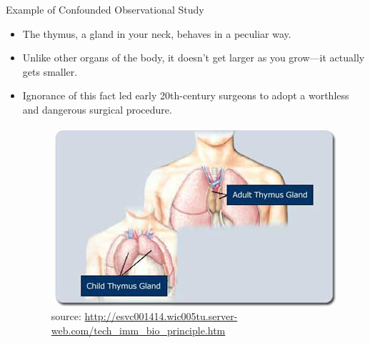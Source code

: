 \documentclass[handout]{beamer}
\begin{document}
\begin{frame}{Example of Confounded Observational Study}
\scriptsize{

\begin{itemize}

 \item The thymus, a gland in your neck, behaves in a peculiar way. 
 
 \item Unlike other organs of the body, it doesn't get larger as you grow—it actually gets smaller. 
 \item Ignorance of this fact led early 20th-century surgeons to adopt a worthless and dangerous surgical procedure.
 
 \begin{figure}[h!]
	\centering
	\includegraphics[scale=0.4]{pics/ThymusSizeDiagram.jpg}
	\caption{source: \url{http://esvc001414.wic005tu.server-web.com/tech_imm_bio_principle.htm}}
\end{figure}
 
  
\end{itemize}



} 
\end{frame}
\end{document}
